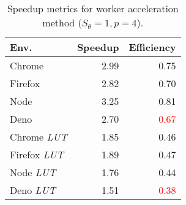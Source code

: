 \begin{wraptable}{r}{6cm}
    \caption{Speedup metrics for worker acceleration method ($S_\theta = 1, p = 4$).}
    \label{tab:worker_speedup}
    \setlength{\tabcolsep}{0.5em}
    \begin{tabular}{lrr}%
        \hline
        Env.        & Speedup & Efficiency              \\
        \hline
        Chrome      & 2.99    & 0.75                    \\
        Firefox     & 2.82    & 0.70                    \\
        Node        & 3.25    & \textcolor{green!70!black}{0.81} \\
        Deno        & 2.70    & \textcolor{red}{0.67}   \\
        Chrome \textit{LUT}  & 1.85    & 0.46                    \\
        Firefox \textit{LUT} & 1.89    & 0.47                    \\
        Node \textit{LUT}    & 1.76    & 0.44                    \\
        Deno \textit{LUT}    & 1.51    & \textcolor{red}{0.38}   \\
        \hline
    \end{tabular}
\end{wraptable}
